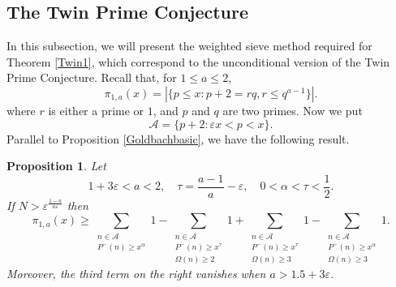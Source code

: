 \documentclass[12pt, a4paper]{amsart}
\def \P {{\mathbb P}}
\def\leq{\leqslant}
\def\le{\leqslant}
\def\ge{\geqslant}
\theoremstyle{plain}
\newtheorem{proposition}{Proposition}[section]
\theoremstyle{remark}
\numberwithin{equation}{section}
\begin{document}
\subsection{The Twin Prime Conjecture}
In this subsection, we will present the weighted sieve method required for Theorem \ref{Twin1}, which correspond to the unconditional 
version of the Twin Prime Conjecture. Recall that, for $1\leq a\leq 2$,   
\begin{equation}\label{pi1a}
\pi_{1,a}(x)=|\{p\le x: p+2=rq,r\le q^{a-1}\}|.
\end{equation}
where $r$ is either a prime or $1$, and $p$ and $q$ are two primes. 
Now we put  
\begin{equation}\label{Def/A=Twin}
\mathscr{A}=\{p+2:\varepsilon x<p<x\}.
\end{equation}
Parallel to Proposition \ref{Goldbachbasic}, we have the following result. 

\begin{proposition}\label{Twinbasic}
Let 
$$
1+3\varepsilon<a<2,\quad \tau=\dfrac{a-1}{a}-\varepsilon, \quad 0<\alpha<\tau<\frac{1}{2}. 
$$
If $N>\varepsilon^{\frac{1-a}{a\varepsilon}}$ then 
\begin{equation}\label{pi1a>}
\pi_{1,a}(x)\ge\sum\limits_{\substack{n\in \mathscr{A}\\P^{-}(n)\ge x^\alpha}}
1-\sum\limits_{\substack{n\in \mathscr{A}\\P^{-}(n)\ge x^\tau\\\Omega(n)\ge 2}}1
+\sum\limits_{\substack{n\in \mathscr{A}\\P^{-}(n)\ge x^\tau\\\Omega(n)\ge 3}}1
-\sum\limits_{\substack{n\in \mathscr{A}\\P^{-}(n)\ge x^\alpha\\\Omega(n)\ge 3}}1. 
\end{equation}
Moreover, the third term on the right vanishes when $a>1.5+3\varepsilon$.
\end{proposition}
\end{document}
